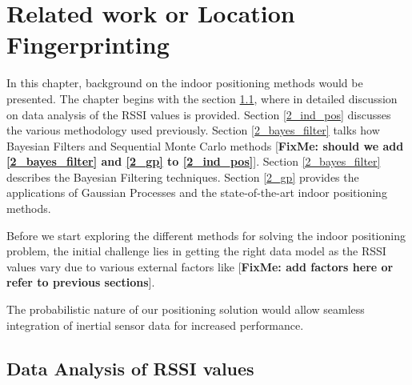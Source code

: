 \chapter{Related work or Location Fingerprinting}

In this chapter, background on the indoor positioning methods would be presented. The chapter begins with the section \ref{2_rssi_data_analysis}, where in detailed discussion on data analysis of the RSSI values is provided. Section \ref{2_ind_pos} discusses the various methodology used previously. Section \ref{2_bayes_filter} talks how Bayesian Filters and Sequential Monte Carlo methods [\textbf{FixMe: should we add \ref{2_bayes_filter} and \ref{2_gp} to \ref{2_ind_pos}}]. Section \ref{2_bayes_filter} describes the Bayesian Filtering techniques. Section \ref{2_gp} provides the applications of Gaussian Processes and the state-of-the-art indoor positioning methods.

Before we start exploring the different methods for solving the indoor positioning problem, the initial challenge lies in getting the right data model as the RSSI values vary due to various external factors like [\textbf{FixMe: add factors here or refer to previous sections}]. 

The probabilistic nature of our positioning solution would allow seamless integration of inertial sensor data for increased performance.


\section{Data Analysis of RSSI values} \label{2_rssi_data_analysis}

